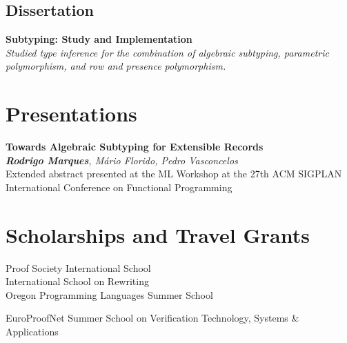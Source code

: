 \documentclass[11pt,a4paper]{moderncv}
\begin{document}
\subsection*{Dissertation}

\begin{description}[labelwidth=60pt,align=right,leftmargin=!]
    \item[\normalfont{\emph{MSc}}] \textbf{Subtyping: Study and Implementation}
                                \\ \emph{Studied type inference for the combination of algebraic subtyping, parametric polymorphism, and row and presence polymorphism.}
\end{description}

\section{Presentations}

\begin{description}[labelwidth=60pt,align=right,leftmargin=!]
    \item[\normalfont{\emph{ML 2022}}]
        \textbf{Towards Algebraic Subtyping for Extensible Records}
        \\ \emph{\textbf{Rodrigo Marques}, Mário Florido, Pedro Vasconcelos}                                
        \\ Extended abstract presented at the ML Workshop at the 27th ACM SIGPLAN International Conference on Functional Programming
\end{description}


\section{Scholarships and Travel Grants}

\begin{description}[labelwidth=60pt,align=right,leftmargin=!]
    \item[\normalfont{\emph{2024}}]
           Proof Society International School
        \\ International School on Rewriting 
        \\ Oregon Programming Languages Summer School
\end{description}

\begin{description}[labelwidth=60pt,align=right,leftmargin=!]
    \item[\normalfont{\emph{2023}}]
        EuroProofNet Summer School on Verification Technology, Systems \& Applications
\end{description}
\end{document}
